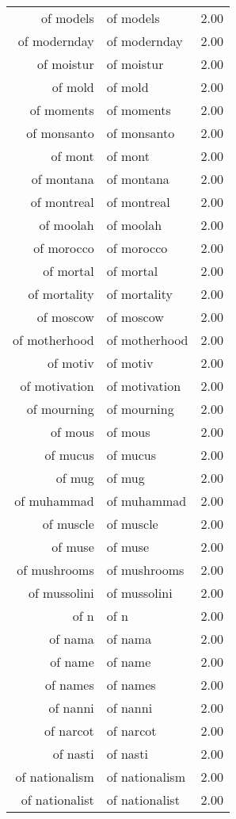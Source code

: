 \begin{table}[ht]
\begin{tabular}{rlr}
  of models & of models & 2.00 \\ 
  of modernday & of modernday & 2.00 \\ 
  of moistur & of moistur & 2.00 \\ 
  of mold & of mold & 2.00 \\ 
  of moments & of moments & 2.00 \\ 
  of monsanto & of monsanto & 2.00 \\ 
  of mont & of mont & 2.00 \\ 
  of montana & of montana & 2.00 \\ 
  of montreal & of montreal & 2.00 \\ 
  of moolah & of moolah & 2.00 \\ 
  of morocco & of morocco & 2.00 \\ 
  of mortal & of mortal & 2.00 \\ 
  of mortality & of mortality & 2.00 \\ 
  of moscow & of moscow & 2.00 \\ 
  of motherhood & of motherhood & 2.00 \\ 
  of motiv & of motiv & 2.00 \\ 
  of motivation & of motivation & 2.00 \\ 
  of mourning & of mourning & 2.00 \\ 
  of mous & of mous & 2.00 \\ 
  of mucus & of mucus & 2.00 \\ 
  of mug & of mug & 2.00 \\ 
  of muhammad & of muhammad & 2.00 \\ 
  of muscle & of muscle & 2.00 \\ 
  of muse & of muse & 2.00 \\ 
  of mushrooms & of mushrooms & 2.00 \\ 
  of mussolini & of mussolini & 2.00 \\ 
  of n & of n & 2.00 \\ 
  of nama & of nama & 2.00 \\ 
  of name & of name & 2.00 \\ 
  of names & of names & 2.00 \\ 
  of nanni & of nanni & 2.00 \\ 
  of narcot & of narcot & 2.00 \\ 
  of nasti & of nasti & 2.00 \\ 
  of nationalism & of nationalism & 2.00 \\ 
  of nationalist & of nationalist & 2.00 \\ 

\end{tabular}
\end{table}

